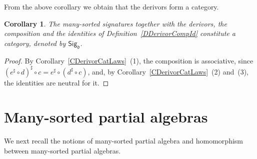 \documentclass[a4paper, reqno]{amsbook}
\theoremstyle{plain}
\newtheorem{corollary}[theorem]{Corollary}
\theoremstyle{definition}
\begin{document}
From the above corollary we obtain that the derivors form a category.

\begin{corollary}\label{CSigdCat}
The many-sorted signatures together with the derivors, the composition and the identities of Definition~\ref{DDerivorCompId} constitute a category, denoted by $\mathsf{Sig}_{\mathfrak{d}}$.
\end{corollary}
\begin{proof}
By Corollary~\ref{CDerivorCatLaws}~(1), the composition is associative, since $(e^{\sharp}\circ d)^{\sharp}\circ c=e^{\sharp}\circ(d^{\sharp}\circ c)$, and, by Corollary~\ref{CDerivorCatLaws}~(2) and~(3), the identities are neutral for it.
\end{proof}

\section{Many-sorted partial algebras}\label{SManySortedPartialAlg}

We next recall the notions of many-sorted partial algebra and homomorphism between many-sorted partial algebras.
\end{document}
